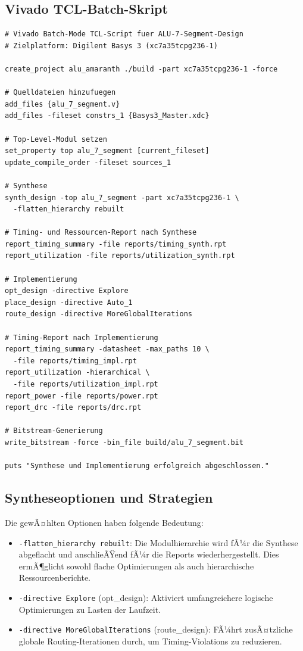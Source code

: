 ﻿\documentclass[12pt,a4paper]{report}
\begin{document}
\subsection{Vivado TCL-Batch-Skript}
\label{subsec:vivado_tcl}

\begin{lstlisting}[style=bashstyle, caption={VollstÃ¤ndiges Vivado Batch-Synthese-Skript}, label={lst:vivado_tcl}]
# Vivado Batch-Mode TCL-Script fuer ALU-7-Segment-Design
# Zielplatform: Digilent Basys 3 (xc7a35tcpg236-1)

create_project alu_amaranth ./build -part xc7a35tcpg236-1 -force

# Quelldateien hinzufuegen
add_files {alu_7_segment.v}
add_files -fileset constrs_1 {Basys3_Master.xdc}

# Top-Level-Modul setzen
set_property top alu_7_segment [current_fileset]
update_compile_order -fileset sources_1

# Synthese
synth_design -top alu_7_segment -part xc7a35tcpg236-1 \
  -flatten_hierarchy rebuilt

# Timing- und Ressourcen-Report nach Synthese
report_timing_summary -file reports/timing_synth.rpt
report_utilization -file reports/utilization_synth.rpt

# Implementierung
opt_design -directive Explore
place_design -directive Auto_1
route_design -directive MoreGlobalIterations

# Timing-Report nach Implementierung
report_timing_summary -datasheet -max_paths 10 \
  -file reports/timing_impl.rpt
report_utilization -hierarchical \
  -file reports/utilization_impl.rpt
report_power -file reports/power.rpt
report_drc -file reports/drc.rpt

# Bitstream-Generierung
write_bitstream -force -bin_file build/alu_7_segment.bit

puts "Synthese und Implementierung erfolgreich abgeschlossen."
\end{lstlisting}

\subsection{Syntheseoptionen und Strategien}
\label{subsec:synthese_optionen}

Die gewÃ¤hlten Optionen haben folgende Bedeutung:

\begin{itemize}
  \item \texttt{-flatten\_hierarchy rebuilt}: Die Modulhierarchie wird fÃ¼r die Synthese abgeflacht und anschlieÃŸend fÃ¼r die Reports wiederhergestellt. Dies ermÃ¶glicht sowohl flache Optimierungen als auch hierarchische Ressourcenberichte.
  \item \texttt{-directive Explore} (opt\_design): Aktiviert umfangreichere logische Optimierungen zu Lasten der Laufzeit.
  \item \texttt{-directive MoreGlobalIterations} (route\_design): FÃ¼hrt zusÃ¤tzliche globale Rou\-ting-Iterationen durch, um Timing-Violations zu reduzieren.
\end{itemize}
\end{document}
